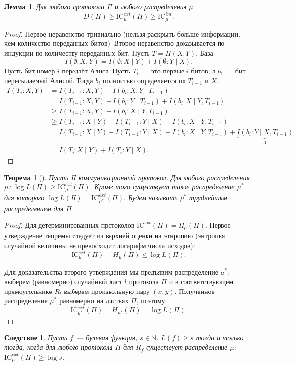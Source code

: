 \documentclass[12pt]{article}
\newcommand{\IC}{\mathrm{IC}}
\newcommand{\Nat}{\mathbb{N}}
\theoremstyle{definition}
\theoremstyle{plain}
\newtheorem{theorem}{Теорема}[section]
\newtheorem{lemma}{Лемма}[section]
\newtheorem{corollary}{Следствие}[section]
\theoremstyle{remark}
\begin{document}
\begin{lemma}
    Для любого протокола $\Pi$ и любого распределения $\mu$
    \[
    D(\Pi) \ge \IC_\mu^{ext}(\Pi) \ge \IC_\mu^{int}.
    \]
\end{lemma}
\begin{proof}
    Первое неравенство тривиально (нельзя раскрыть больше информации, 
    чем количество переданных битов).
    Второе неравенство доказывается по индукции по количеству
    переданных бит. Пусть $T=\Pi(X,Y)$. База
    \[
        I(\emptyset:X,Y) = I(\emptyset:X\mid Y) + I(\emptyset:Y\mid X).
    \]
    Пусть бит номер $i$ передаёт Алиса. Пусть $T_i$~--- это первые $i$ битов,
    а $b_i$~--- бит пересылаемый Алисой. Тогда $b_i$ полностью определяется по $T_{i-1}$ и $X$.
    \[
        \begin{aligned}
        I(T_i:X,Y) 
        & = I(T_{i-1}:X,Y) + I(b_i:X,Y \mid T_{i-1}) \\
        & = I(T_{i-1}:X,Y) + I(b_i : Y\mid T_{i-1}) + I(b_i : X\mid Y, T_{i-1})\\
        & \ge I(T_{i-1}:X,Y) + I(b_i : X\mid Y, T_{i-1})\\
        & \ge I(T_{i-1}:X\mid Y) + I(T_{i-1}:Y\mid X) + I(b_i : X\mid Y, T_{i-1}) \\
        & = I(T_{i-1}:X\mid Y) + I(T_{i-1}:Y\mid X) + I(b_i : X\mid Y, T_{i-1}) + \underbrace{I(b_i : Y \mid X, T_{i-1})}_0 \\
        & = I(T_i:X\mid Y) + I(T_i:Y\mid X).
        \end{aligned}
    \]
\end{proof}

\begin{theorem}[\cite{DMWW12}]
    Пусть $\Pi$ коммуникационный протокол. Для любого распределения $\mu$:
    \(
        \log L(\Pi) \ge \IC_\mu^{ext}(\Pi).
    \)
    Кроме того существует такое распределение $\mu^*$ для которого 
    \(
    \log L(\Pi) = \IC_{\mu^*}^{ext}(\Pi).
    \)
    Будем называть $\mu^*$ \emph{труднейшим} распределением для $\Pi$.
\end{theorem}
\begin{proof} Для детерминированных протоколов $\IC^{ext}(\Pi) = H_\mu(\Pi)$.
    Первое утверждение теоремы следует из верхней оценки на этнропию (энтропия
    случайной величины не превосходит логарифм числа исходов):
    \[
    \IC_\mu^{ext}(\Pi) = H_\mu(\Pi) \le \log L(\Pi).
    \]

    Для доказательства второго утверждения мы предъявим распределение $\mu^*$:
    выберем (равномерно) случайный лист $l$ протокола $\Pi$ и в соответствующем 
    прямоугольнике $R_l$ выберем произвольную пару $(x,y)$. Полученное
    распределение $\mu^*$ равномерно на листьях $\Pi$, поэтому
    \[
    \IC_{\mu^*}^{ext}(\Pi) = H_{\mu^*}(\Pi) = \log L(\Pi).
    \]
\end{proof}
\begin{corollary}
    Пусть $f$~--- булевая функция, $s\in\Nat$. $L(f)\ge s$ тогда и только тогда,
    когда для любого протокола $\Pi$ для $R_f$ существует распределение $\mu$:
    $\IC_\mu^{ext}(\Pi)\ge \log s$.
\end{corollary}
\end{document}
